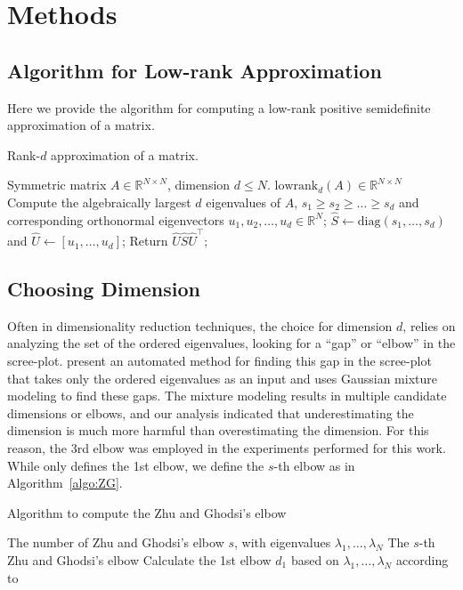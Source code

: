 \documentclass[journal,twoside,web]{ieeecolor}
\renewcommand{\Re}{\mathbb{R}}
\begin{document}
\clearpage
{}
\setcounter{page}{1}
\appendices


\section{Methods}
\label{sec:method}

\subsection{Algorithm for Low-rank Approximation}
Here we provide the algorithm for computing a low-rank positive semidefinite approximation of a matrix.

\begin{algorithm}[H]
\caption{Rank-$d$ approximation of a matrix.}
\label{algo:lowrank}
\begin{algorithmic}[1]
\REQUIRE Symmetric matrix $A\in \Re^{N\times N}$, dimension $d\leq N$.
\ENSURE $\mathrm{lowrank}_d(A)\in \Re^{N\times N}$
\STATE Compute the algebraically largest $d$ eigenvalues of $A$, $s_1\geq s_2\geq \dotsc\geq s_d$ and corresponding orthonormal eigenvectors $u_1,u_2,\dotsc,u_d\in \Re^N$;
\STATE $\hat{S} \leftarrow \mathrm{diag}(s_1,\dotsc,s_d)$ and  $\hat{U} \leftarrow [u_1,\dotsc,u_d]$;
\STATE Return $\hat{U}\hat{S}\hat{U}^{\top}$;
\end{algorithmic}
\end{algorithm}


\subsection{Choosing Dimension}
\label{section:dim_select}
Often in dimensionality reduction techniques, the choice for dimension $d$, relies on analyzing the set of the ordered eigenvalues, looking for a ``gap'' or ``elbow'' in the scree-plot.  present an automated method for finding this gap in the scree-plot that takes only the ordered eigenvalues as an input and uses Gaussian mixture modeling to find these gaps.
The mixture modeling results in multiple candidate dimensions or elbows, and our analysis indicated that underestimating the dimension is much more harmful than overestimating the dimension.
For this reason, the 3rd elbow was employed in the experiments performed for this work. While  only defines the 1st elbow, we define the $s$-th elbow as in Algorithm~\ref{algo:ZG}.

\begin{algorithm}[H]
\caption{Algorithm to compute the Zhu and Ghodsi's elbow}
\label{algo:ZG}
\begin{algorithmic}[1]
\REQUIRE The number of Zhu and Ghodsi's elbow $s$, with eigenvalues $\lambda_1, \dots, \lambda_N$
\ENSURE The $s$-th Zhu and Ghodsi's elbow
\STATE Calculate the 1st elbow $d_1$ based on $\lambda_1, \dots, \lambda_N$ according to 
\ENDFOR
\end{algorithmic}
\end{algorithm}
\end{document}
